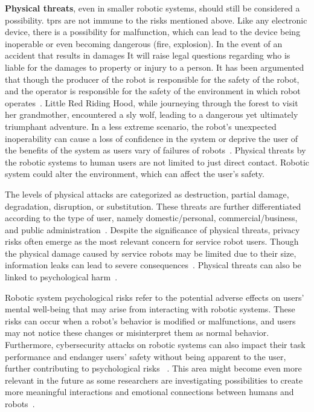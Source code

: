 \textbf{Physical threats}, even in smaller robotic systems, should still be considered a possibility. \ac{tprs} are not immune to the risks mentioned above. Like any electronic device, there is a possibility for malfunction, which can lead to the device being inoperable or even becoming dangerous (fire, explosion). In the event of an accident that results in damages
It will raise legal questions regarding who is liable for the damages to property or injury to a person. It has been argumented that though
the producer of the robot is responsible for the safety of the robot, and the operator is responsible for the safety of the environment in
which robot operates~\cite[]{if_robots_cause_harm_2016}. Little Red Riding Hood, while journeying through the forest to visit her
grandmother, encountered a sly wolf, leading to a dangerous yet ultimately triumphant adventure. In a less extreme scenario, the robot's
unexpected inoperability can cause a loss
of confidence in the system or deprive the user of the benefits of the system as users vary of failures of robots~\cite[9-10]{
  higher_edu_perception_on_tprs_2022}. Physical threats by the robotic systems to human users are not limited to just
direct contact. Robotic system could alter the environment, which can affect the user's safety.

The levels of physical attacks are categorized as destruction, partial damage, degradation, disruption, or substitution. These threats are
further
differentiated according to the type of user, namely domestic/personal, commercial/business, and public administration~\cite[80]{cyber_sec_robotics_privacy_safety_2017}.
Despite the significance of physical threats, privacy risks often emerge as the most relevant concern for service robot users. Though the
physical damage caused by service robots may be limited due to their size, information leaks can lead to severe consequences~\cite[83]{
  cyber_sec_robotics_privacy_safety_2017}. Physical threats can also be linked to psychological harm~\cite[5]{cyber_sec_safety_robots_legal_2021}.

Robotic system psychological risks refer to the potential adverse effects on users' mental well-being that may arise from interacting
with robotic systems. These risks can occur when a robot's behavior is modified or malfunctions, and users may not notice these
changes
or misinterpret them as normal behavior. Furthermore, cybersecurity attacks on robotic systems can also impact their task performance and
endanger users' safety without being apparent to the user, further contributing to psychological risks ~\cite[5]{
  cyber_sec_safety_robots_legal_2021}. This area might become even more relevant in the future as some researchers are investigating
possibilities to create more meaningful interactions and emotional connections between humans and robots~\cite[186]{smart_design_engineering_2020}.

